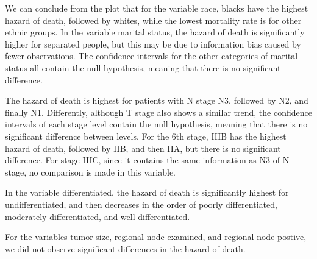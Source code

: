 \documentclass[
]{article}
\begin{document}
We can conclude from the plot that for the variable race, blacks have
the highest hazard of death, followed by whites, while the lowest
mortality rate is for other ethnic groups. In the variable marital
status, the hazard of death is significantly higher for separated
people, but this may be due to information bias caused by fewer
observations. The confidence intervals for the other categories of
marital status all contain the null hypothesis, meaning that there is no
significant difference.

The hazard of death is highest for patients with N stage N3, followed by
N2, and finally N1. Differently, although T stage also shows a similar
trend, the confidence intervals of each stage level contain the null
hypothesis, meaning that there is no significant difference between
levels. For the 6th stage, IIIB has the highest hazard of death,
followed by IIB, and then IIA, but there is no significant difference.
For stage IIIC, since it contains the same information as N3 of N stage,
no comparison is made in this variable.

In the variable differentiated, the hazard of death is significantly
highest for undifferentiated, and then decreases in the order of poorly
differentiated, moderately differentiated, and well differentiated.

For the variables tumor size, regional node examined, and regional node
postive, we did not observe significant differences in the hazard of
death.
\end{document}
